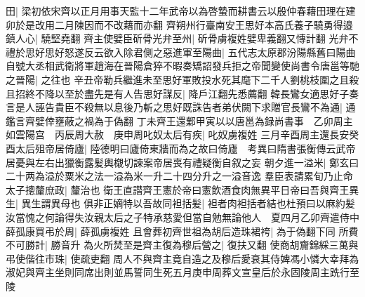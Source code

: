 田|{
	梁初依宋齊以正月用事天監十二年武帝以為啓蟄而耕書云以殷仲春藉田理在建卯於是改用二月陳因而不改藉而亦翻}
齊朔州行臺南安王思好本高氏養子驍勇得邉鎮人心|{
	驍堅堯翻}
齊主使嬖臣斫骨光弁至州|{
	斫骨虜複姓嬖卑義翻又慱計翻}
光弁不禮於思好思好怒遂反云欲入除君側之惡進軍至陽曲|{
	五代志太原郡汾陽縣舊曰陽曲}
自號大丞相武衛將軍趙海在晉陽倉猝不暇奏矯詔發兵拒之帝聞變使尚書令唐邕等馳之晉陽|{
	之往也}
辛丑帝勒兵繼進未至思好軍敗投水死其麾下二千人劉桃枝圍之且殺且招終不降以至於盡先是有人告思好謀反|{
	降戶江翻先悉薦翻}
韓長鸞女適思好子奏言是人誣告貴臣不殺無以息後乃斬之思好既誅告者弟伏闕下求贈官長鸞不為通|{
	通鑑言齊嬖倖壅蔽之禍為于偽翻}
丁未齊王還鄴甲寅以以唐邕為録尚書事　乙卯周主如雲陽宫　丙辰周大赦　庚申周叱奴太后有疾|{
	叱奴虜複姓}
三月辛酉周主還長安癸酉太后殂帝居倚廬|{
	陸德明曰廬倚東牆而為之故曰倚廬　考異曰隋書張衡傳云武帝居憂與左右出獵衡露髪輿櫬切諫案帝居喪有禮疑衡自叙之妄}
朝夕進一溢米|{
	鄭玄曰二十两為溢於粟米之法一溢為米一升二十四分升之一溢音逸}
羣臣表請累旬乃止命太子摠釐庶政|{
	釐治也}
衛王直譛齊王憲於帝曰憲飲酒食肉無異平日帝曰吾與齊王異生|{
	異生謂異母也}
俱非正嫡特以吾故同袒括髪|{
	袒者肉袒括者結也杜預曰以麻約髪}
汝當愧之何論得失汝親太后之子特承慈愛但當自勉無論他人　夏四月乙卯齊遣侍中薛孤康買弔於周|{
	薛孤虜複姓}
且會葬初齊世祖為胡后造珠裙袴|{
	為于偽翻下同}
所費不可勝計|{
	勝音升}
為火所焚至是齊主復為穆后營之|{
	復扶又翻}
使商胡齎錦綵三萬與弔使偕往市珠|{
	使疏吏翻}
周人不與齊主竟自造之及穆后愛衰其侍婢馮小憐大幸拜為淑妃與齊主坐則同席出則並馬誓同生死五月庚申周葬文宣皇后於永固陵周主跣行至陵

